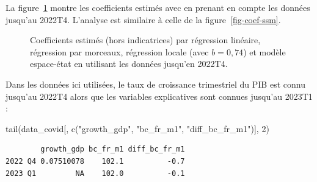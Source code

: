\documentclass[
  a4paper,
  DIV=11,
  numbers=noendperiod,
  french]{scrartcl}
\newenvironment{Shaded}{\begin{snugshade}}{\end{snugshade}}
\newcommand{\DecValTok}[1]{\textcolor[rgb]{0.68,0.00,0.00}{#1}}
\newcommand{\FunctionTok}[1]{\textcolor[rgb]{0.28,0.35,0.67}{#1}}
\newcommand{\NormalTok}[1]{\textcolor[rgb]{0.00,0.23,0.31}{#1}}
\newcommand{\StringTok}[1]{\textcolor[rgb]{0.13,0.47,0.30}{#1}}
\newcommand\1{{\mathds 1}}
\theoremstyle{remark}
\begin{document}
La figure~\ref{fig-coef-covid} montre les coefficients estimés avec en
prenant en compte les données jusqu'au 2022T4. L'analyse est similaire à
celle de la figure~\ref{fig-coef-ssm}.

\begin{figure}

\caption{\label{fig-coef-covid}Coefficients estimés (hors indicatrices)
par régression linéaire, régression par morceaux, régression locale
(avec \(b=0,74\)) et modèle espace-état en utilisant les données
jusqu'en 2022T4.}


\end{figure}%

Dans les données ici utilisées, le taux de croissance trimestriel du PIB
est connu jusqu'au 2022T4 alors que les variables explicatives sont
connues jusqu'au 2023T1 :

\begin{Shaded}
\begin{Highlighting}[]
\FunctionTok{tail}\NormalTok{(data\_covid[, }\FunctionTok{c}\NormalTok{(}\StringTok{"growth\_gdp"}\NormalTok{, }\StringTok{"bc\_fr\_m1"}\NormalTok{, }\StringTok{"diff\_bc\_fr\_m1"}\NormalTok{)], }\DecValTok{2}\NormalTok{)}
\end{Highlighting}
\end{Shaded}

\begin{verbatim}
        growth_gdp bc_fr_m1 diff_bc_fr_m1
2022 Q4 0.07510078    102.1          -0.7
2023 Q1         NA    102.0          -0.1
\end{verbatim}
\end{document}
